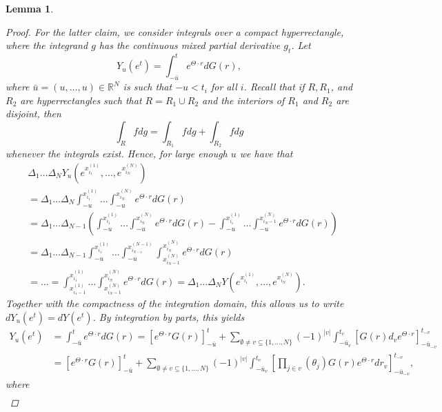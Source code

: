 \documentclass[english, a4paper, 12pt,reqno]{amsart}
\newtheorem{lemma}[defi]{Lemma}
\begin{document}
\begin{lemma}
\begin{proof}
For the latter claim, we consider integrals over a compact hyperrectangle, where the integrand $g$ has the continuous mixed partial derivative $g_t$. Let
$$Y_u(e^t) = \int_{-\bar{u}}^t e^{\Theta\cdot r} dG(r),$$
where $\bar{u} = (u,\dots, u)\in\mathbb{R}^N$ is such that $-u < t_i$ for all $i$.
Recall that if $R, R_1$, and $R_2$ are hyperrectangles such that $R = R_1\cup R_2$ and the interiors of $R_1$ and $R_2$ are disjoint, then
$$\int_R f dg = \int_{R_1} f dg + \int_{R_2} f dg$$
whenever the integrals exist. Hence, for large enough $u$ we have that
\begin{equation*}
\begin{split}
&\Delta_1\dots \Delta_N Y_u(e^{x_{i_1}^{(1)}}, \dots, e^{x_{i_N}^{(N)}})\\
 &=\Delta_1\dots \Delta_N \int_{-u}^{x_{i_1}^{(1)}}\dots \int_{-u}^{x_{i_N}^{(N)}}e^{\Theta\cdot r} dG(r)\\
 &= \Delta_1\dots \Delta_{N-1}\left(\int_{-u}^{x_{i_1}^{(1)}}\dots \int_{-u}^{x_{i_N}^{(N)}}e^{\Theta\cdot r} dG(r) - \int_{-u}^{x_{i_1}^{(1)}}\dots \int_{-u}^{x_{i_N-1}^{(N)}}e^{\Theta\cdot r} dG(r) \right )\\
 &= \Delta_1\dots \Delta_{N-1} \int_{-u}^{x_{i_1}^{(1)}}\dots \int_{-u}^{x_{i_{N-1}}^{(N-1)}}\int_{x_{i_N-1}^{(N)}}^{x_{i_N}^{(N)}}e^{\Theta\cdot r} dG(r)\\
 &= \dots = \int_{x_{i_1-1}^{(1)}}^{x_{i_1}^{(1)}} \dots \int_{x_{i_N-1}^{(N)}}^{x_{i_N}^{(N)}} e^{\Theta\cdot r} dG(r) = \Delta_1\dots \Delta_N Y(e^{x_{i_1}^{(1)}}, \dots, e^{x_{i_N}^{(N)}}).
\end{split}
\end{equation*}
Together with the compactness of the integration domain, this allows us to write $dY_u(e^t) = dY(e^t)$. By integration by parts, this yields
\begin{equation*}
\begin{split}
Y_u(e^t) &= \int_{-\bar{u}}^t e^{\Theta\cdot r} dG(r) = [e^{\Theta\cdot r} G(r)]_{-\bar{u}}^t + \sum_{\emptyset\neq v \subseteq \{1,\dots,N\}}(-1)^{|v|} \int_{-\bar{u}_v}^{t_v} [G(r)d_ve^{\Theta\cdot r}]_{-\bar{u}_{-v}}^{t_{-v}}\\
&= [e^{\Theta\cdot r} G(r)]_{-\bar{u}}^t + \sum_{\emptyset\neq v \subseteq \{1,\dots,N\}}(-1)^{|v|} \int_{-\bar{u}_v}^{t_v} [\prod_{j\in v} (\theta_j) G(r)e^{\Theta\cdot r} dr_v]_{-\bar{u}_{-v}}^{t_{-v}},
\end{split}
\end{equation*}
where
\begin{equation}
\label{combo}
\begin{split}

\end{split}
\end{equation}
\end{proof}
\end{lemma}
\end{document}
